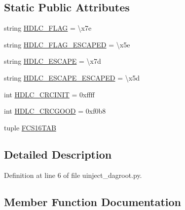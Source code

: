 \subsection*{Static Public Attributes}
\begin{DoxyCompactItemize}
\item 
string \hyperlink{classuinject__dagroot_1_1_open_hdlc_a49aac6e146f8b58775baa2656ed3551a}{H\+D\+L\+C\+\_\+\+F\+L\+AG} = \textquotesingle{}\textbackslash{}x7e\textquotesingle{}
\item 
string \hyperlink{classuinject__dagroot_1_1_open_hdlc_a5d91215ec60894c6cd7fc3063f9ce08b}{H\+D\+L\+C\+\_\+\+F\+L\+A\+G\+\_\+\+E\+S\+C\+A\+P\+ED} = \textquotesingle{}\textbackslash{}x5e\textquotesingle{}
\item 
string \hyperlink{classuinject__dagroot_1_1_open_hdlc_a37948c1823460393e9620894686f9b33}{H\+D\+L\+C\+\_\+\+E\+S\+C\+A\+PE} = \textquotesingle{}\textbackslash{}x7d\textquotesingle{}
\item 
string \hyperlink{classuinject__dagroot_1_1_open_hdlc_a7391613b4b4eb96dc10c54efe82525fa}{H\+D\+L\+C\+\_\+\+E\+S\+C\+A\+P\+E\+\_\+\+E\+S\+C\+A\+P\+ED} = \textquotesingle{}\textbackslash{}x5d\textquotesingle{}
\item 
int \hyperlink{classuinject__dagroot_1_1_open_hdlc_a2eab537e67ea04bb40dc429a289694a4}{H\+D\+L\+C\+\_\+\+C\+R\+C\+I\+N\+IT} = 0xffff
\item 
int \hyperlink{classuinject__dagroot_1_1_open_hdlc_ac89e62e50a8670281cf6a87f8d517eb0}{H\+D\+L\+C\+\_\+\+C\+R\+C\+G\+O\+OD} = 0xf0b8
\item 
tuple \hyperlink{classuinject__dagroot_1_1_open_hdlc_a6fa5e8e2712ec2a0b306e9a3b4d3820a}{F\+C\+S16\+T\+AB}
\end{DoxyCompactItemize}


\subsection{Detailed Description}


Definition at line 6 of file uinject\+\_\+dagroot.\+py.



\subsection{Member Function Documentation}
